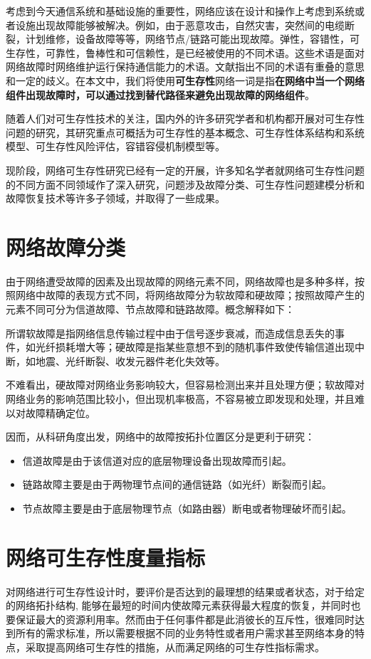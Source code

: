 考虑到今天通信系统和基础设施的重要性，网络应该在设计和操作上考虑到系统或者设施出现故障能够被解决。例如，由于恶意攻击，自然灾害，突然间的电缆断裂，计划维修，设备故障等等，网络节点/链路可能出现故障。弹性，容错性，可生存性，可靠性，鲁棒性和可信赖性，是已经被使用的不同术语。这些术语是面对网络故障时网络维护运行保持通信能力的术语。文献指出不同的术语有重叠的意思和一定的歧义。在本文中，我们将使用\textbf{可生存性}网络一词是指\textbf{在网络中当一个网络组件出现故障时，可以通过找到替代路径来避免出现故障的网络组件}。


随着人们对可生存性技术的关注，国内外的许多研究学者和机构都开展对可生存性问题的研究，其研究重点可概括为可生存性的基本概念\cite{kuipers2012overview}、可生存性体系结构和系统模型\cite{luxinhua2006}、可生存性风险评估\cite{linxuegang2006}，容错容侵机制模型\cite{linchuang2005}等。

现阶段，网络可生存性研究已经有一定的开展，许多知名学者就网络可生存性问题的不同方面不同领域作了深入研究，问题涉及故障分类、可生存性问题建模分析和故障恢复技术等许多子领域，并取得了一些成果。

\section{网络故障分类}
由于网络遭受故障的因素及出现故障的网络元素不同，网络故障也是多种多样，按照网络中故障的表现方式不同，将网络故障分为软故障和硬故障\cite{sebos2001auto}；按照故障产生的元素不同可分为信道故障、节点故障和链路故障。概念解释如下：

所谓软故障是指网络信息传输过程中由于信号逐步衰减，而造成信息丢失的事 件，如光纤损耗増大等；硬故障是指某些意想不到的随机事件致使传输信道出现中断，如地震、光纤断裂、收发元器件老化失效等。

不难看出，硬故障对网络业务影响较大，但容易检测出来并且处理方便；软故障对网络业务的影响范围比较小，但出现机率极高，不容易被立即发现和处理，并且难以对故障精确定位。

因而，从科研角度出发，网络中的故障按拓扑位置区分是更利于研究：
\begin{itemize}
\item 信道故障是由于该信道对应的底层物理设备出现故障而引起。
\item 链路故障主要是由于两物理节点间的通信链路（如光纤）断裂而引起。
\item 节点故障主要是由于底层物理节点（如路由器）断电或者物理破坏而引起。
\end{itemize}



\section{网络可生存性度量指标}
对网络进行可生存性设计时，要评价是否达到的最理想的结果或者状态，对于给定的网络拓扑结构, 能够在最短的时间内使故障元素获得最大程度的恢复，并同时也要保证最大的资源利用率\cite{wangxiujun2008}。然而由于任何事件都是此消彼长的互斥性，很难同时达到所有的需求标准，所以需要根据不同的业务特性或者用户需求甚至网络本身的特点，采取提高网络可生存性的措施，从而满足网络的可生存性指标需求。

